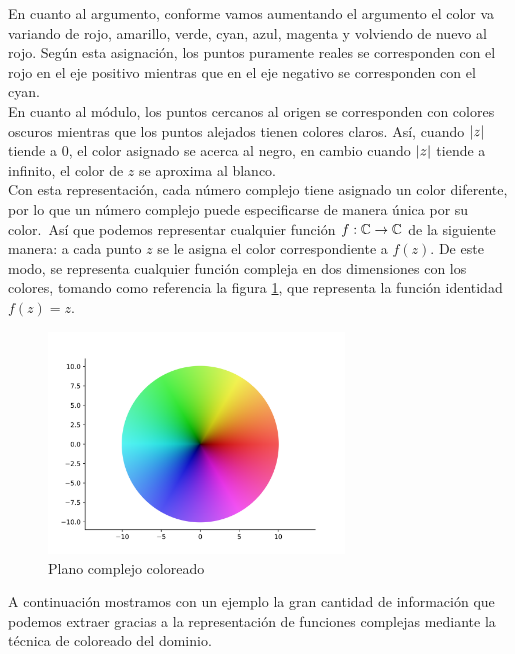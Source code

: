 En cuanto al argumento, conforme vamos aumentando el argumento el color va variando de rojo, amarillo, verde, cyan, azul, magenta y volviendo de nuevo al rojo. Según esta asignación, los puntos puramente reales se corresponden con el rojo en el eje positivo mientras que en el eje negativo se corresponden con el cyan. \\

En cuanto al módulo, los puntos cercanos al origen se corresponden con colores oscuros mientras que los puntos alejados tienen colores claros. Así, cuando $\left\lvert z\right\rvert$ tiende a $0$, el color asignado se acerca al negro, en cambio cuando $\left\lvert z\right\rvert$ tiende a infinito, el color de $z$ se aproxima al blanco. \\

Con esta representación, cada número complejo tiene asignado un color diferente, por lo que un número complejo puede especificarse de manera única por su color. Así que podemos representar cualquier función $f : \mathbb{C} \to \mathbb{C}$ de la siguiente manera: a cada punto $z$ se le asigna el color correspondiente a $f(z)$. De este modo, se representa cualquier función compleja en dos dimensiones con los colores, tomando como referencia la figura \ref{fig:z}, que representa la función identidad $f(z) = z$. \\

\begin{figure}[h]
    \centering
    \includegraphics[width=0.7\textwidth]{../Aplicacion/z.png}
    \caption{Plano complejo coloreado}
    \label{fig:z}
\end{figure}

A continuación mostramos con un ejemplo la gran cantidad de información que podemos extraer gracias a la representación de funciones complejas mediante la técnica de coloreado del dominio. \\


